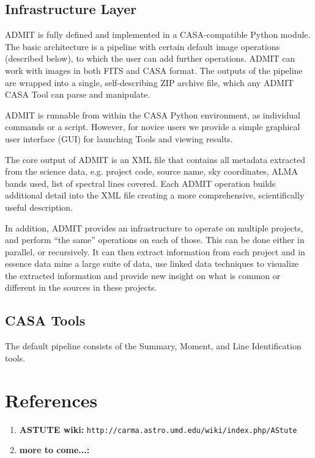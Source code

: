 \documentclass[preprint]{aastex} %
\begin{document}
\subsection{ Infrastructure Layer }


ADMIT is fully defined and implemented in a CASA-compatible Python module.
The basic architecture is a pipeline with certain default image operations
(described below), to which the user can add further operations.  ADMIT can
work with images in both FITS and CASA format.  The outputs of the pipeline
are wrapped into a single, self-describing ZIP archive file, which any
ADMIT CASA Tool can parse and manipulate.

ADMIT is runnable from within the CASA Python environment, as individual
commands or a script.  However, for novice users we provide a simple
graphical user interface (GUI) for launching Tools and viewing results.

The core output of ADMIT is an XML file that contains all metadata
extracted from the science data, e.g.  project code, source name, sky
coordinates, ALMA bands used, list of spectral lines covered.  Each ADMIT
operation builds additional detail into the XML file creating a more
comprehensive, scientifically useful description.

In addition, ADMIT provides an infrastructure to operate on multiple
projects, and perform ``the same'' operations on each of those. This
can be done either in parallel, or recursively. It can then extract
information from each project and in essence data mine a large suite
of data, use linked data techniques to visualize the extracted
information and provide new insight on what is common or different in
the sources in these projects.


\subsection{ CASA Tools }

The default pipeline consists of the Summary, Moment, and Line
Identification tools.



\section*{References}

\begin{enumerate}
\item
{\bf ASTUTE wiki:} {\tt  http://carma.astro.umd.edu/wiki/index.php/AStute}

\item
{\bf more to come...:}

\end{enumerate}
\end{document}
